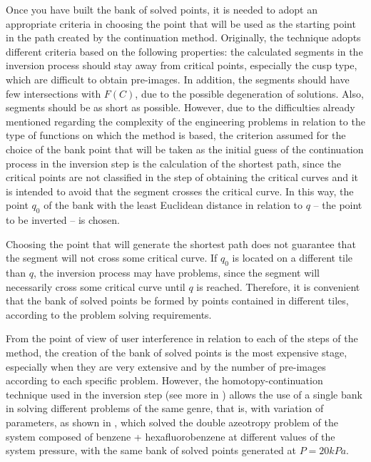 \documentclass[journal=iecred,manuscript=article]{achemso}
\theoremstyle{definition}
\theoremstyle{remark}
\begin{document}
Once you have built the bank of solved points, it is needed to adopt an appropriate criteria in choosing the point that will be used as the starting point in the path created by the continuation method. Originally, the technique adopts different criteria based on the following properties: the calculated segments in the inversion process should stay away from critical points, especially the cusp type, which are difficult to obtain pre-images. In addition, the segments should have few intersections with $ F\left(C\right) $, due to the possible degeneration of solutions. Also, segments should be as short as possible. However, due to the difficulties already mentioned regarding the complexity of the engineering problems in relation to the type of functions on which the method is based, the criterion assumed for the choice of the bank point that will be taken as the initial guess of the continuation process in the inversion step is the calculation of the shortest path, since the critical points are not classified in the step of obtaining the critical curves and it is intended to avoid that the segment crosses the critical curve. In this way, the point $ q_{0} $ of the bank with the least Euclidean distance in relation to $ q $ -- the point to be inverted -- is chosen.

Choosing the point that will generate the shortest path does not guarantee that the segment will not cross some critical curve. If $ q_{0} $ is located on a different tile than $ q $, the inversion process may have problems, since the segment will necessarily cross some critical curve until $ q $ is reached. Therefore, it is convenient that the bank of solved points be formed by points contained in different tiles, according to the problem solving requirements.

From the point of view of user interference in relation to each of the steps of the method, the creation of the bank of solved points is the most expensive stage, especially when they are very extensive and by the number of pre-images according to each specific problem. However, the homotopy-continuation technique used in the inversion step (see more in \citet{allgower}) allows the use of a single bank in solving different problems of the same genre, that is, with variation of parameters, as shown in \citet{canadian}, which solved the double azeotropy problem of the system composed of benzene + hexafluorobenzene at different values of the system pressure, with the same bank of solved points generated at $ P = 20 kPa $.
\end{document}
